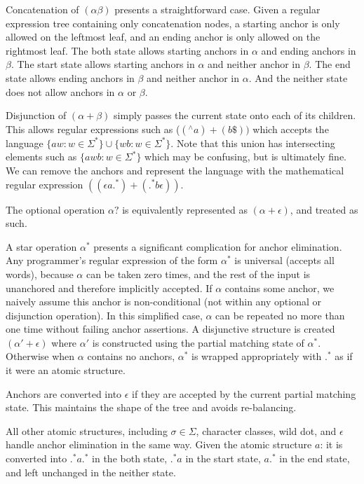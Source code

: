 Concatenation of $(\alpha \beta)$ presents a straightforward case. Given a regular expression tree containing only concatenation nodes, a starting anchor is only allowed on the leftmost leaf, and an ending anchor is only allowed on the rightmost leaf. The both state allows starting anchors in $\alpha$ and ending anchors in $\beta$. The start state allows starting anchors in $\alpha$ and neither anchor in $\beta$. The end state allows ending anchors in $\beta$ and neither anchor in $\alpha$. And the neither state does not allow anchors in $\alpha$ or $\beta$.

Disjunction of $(\alpha + \beta)$ simply passes the current state onto each of its children. This allows regular expressions such as ($(^\wedge a)+(b \$))$ which accepts the language $\{aw:w\in\Sigma^*\}\cup\{wb:w\in\Sigma^*\}$. Note that this union has intersecting elements such as $\{awb:w\in\Sigma^*\}$ which may be confusing, but is ultimately fine. We can remove the anchors and represent the language with the mathematical regular expression $((\epsilon a .^*) + (.^* b \epsilon ))$.

The optional operation $\alpha?$ is equivalently represented as $(\alpha + \epsilon)$, and treated as such.

A star operation $\alpha^*$ presents a significant complication for anchor elimination. Any programmer's regular expression of the form $\alpha^*$ is universal (accepts all words), because $\alpha$ can be taken zero times, and the rest of the input is unanchored and therefore implicitly accepted. If $\alpha$ contains some anchor, we naively assume this anchor is non-conditional (not within any optional or disjunction operation). In this simplified case, $\alpha$ can be repeated no more than one time without failing anchor assertions. A disjunctive structure is created $(\alpha'+\epsilon)$ where $\alpha'$ is constructed using the partial matching state of $\alpha^*$. Otherwise when $\alpha$ contains no anchors, $\alpha^*$ is wrapped appropriately with $.^*$ as if it were an atomic structure.

Anchors are converted into $\epsilon$ if they are accepted by the current partial matching state. This maintains the shape of the tree and avoids re-balancing.

All other atomic structures, including $\sigma \in \Sigma$, character classes, wild dot, and $\epsilon$ handle anchor elimination in the same way. Given the atomic structure $a$: it is converted into $.^*a.^*$ in the both state, $.^*a$ in the start state, $a.^*$ in the end state, and left unchanged in the neither state.

